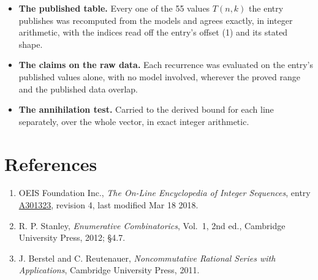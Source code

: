 \documentclass[11pt]{article}
\theoremstyle{definition}
\begin{document}
\begin{itemize}

\item {\bfseries The published table.} Every one of the 55 values $T(n,k)$ the entry publishes was recomputed from the models and agrees exactly, in integer arithmetic, with the indices read off the entry's offset (1) and its stated shape.

\item {\bfseries The claims on the raw data.} Each recurrence was evaluated on the entry's published values alone, with no model involved, wherever the proved range and the published data overlap.

\item {\bfseries The annihilation test.} Carried to the derived bound for each line separately, over the whole vector, in exact integer arithmetic.

\end{itemize}

\section{References}

\begin{enumerate}

\item OEIS Foundation Inc., \emph{The On-Line Encyclopedia of Integer Sequences}, entry \href{https://oeis.org/A301323}{A301323}, revision 4, last modified Mar 18 2018.

\item R. P. Stanley, \emph{Enumerative Combinatorics}, Vol.~1, 2nd ed., Cambridge University Press, 2012; \S4.7.

\item J. Berstel and C. Reutenauer, \emph{Noncommutative Rational Series with Applications}, Cambridge University Press, 2011.

\end{enumerate}
\end{document}
